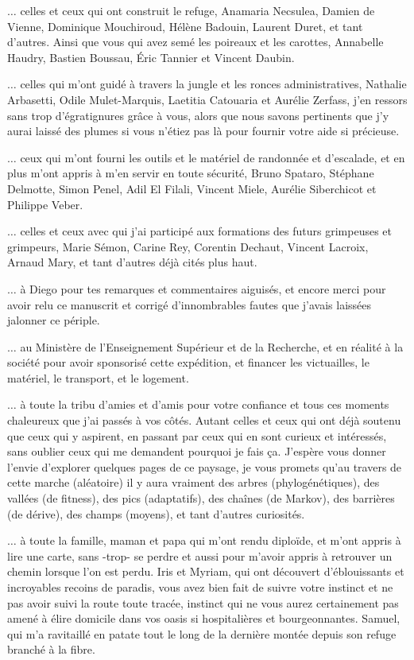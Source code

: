 $\hdots$ celles et ceux qui ont construit le refuge, Anamaria Necsulea, Damien de Vienne, Dominique Mouchiroud, Hélène Badouin, Laurent Duret, et tant d’autres.
Ainsi que vous qui avez semé les poireaux et les carottes, Annabelle Haudry, Bastien Boussau, Éric Tannier et Vincent Daubin.

$\hdots$ celles qui m’ont guidé à travers la jungle et les ronces administratives, Nathalie Arbasetti, Odile Mulet-Marquis, Laetitia Catouaria et Aurélie Zerfass, j’en ressors sans trop d’égratignures grâce à vous, alors que nous savons pertinents que j’y aurai laissé des plumes si vous n’étiez pas là pour fournir votre aide si précieuse.

$\hdots$ ceux qui m’ont fourni les outils et le matériel de randonnée et d’escalade, et en plus m’ont appris à m’en servir en toute sécurité, Bruno Spataro, Stéphane Delmotte, Simon Penel, Adil El Filali, Vincent Miele, Aurélie Siberchicot et Philippe Veber.

$\hdots$ celles et ceux avec qui j’ai participé aux formations des futurs grimpeuses et grimpeurs, Marie Sémon, Carine Rey, Corentin Dechaut, Vincent Lacroix, Arnaud Mary, et tant d’autres déjà cités plus haut.

$\hdots$ à Diego pour tes remarques et commentaires aiguisés, et encore merci pour avoir relu ce manuscrit et corrigé d’innombrables fautes que j'avais laissées jalonner ce périple.

$\hdots$ au Ministère de l’Enseignement Supérieur et de la Recherche, et en réalité à la société pour avoir sponsorisé cette expédition, et financer les victuailles, le matériel, le transport, et le logement.

$\hdots$ à toute la tribu d’amies et d’amis pour votre confiance et tous ces moments chaleureux que j’ai passés à vos côtés.
Autant celles et ceux qui ont déjà soutenu que ceux qui y aspirent, en passant par ceux qui en sont curieux et intéressés, sans oublier ceux qui me demandent pourquoi je fais ça.
J’espère vous donner l’envie d’explorer quelques pages de ce paysage, je vous promets qu’au travers de cette marche (aléatoire) il y aura vraiment des arbres (phylogénétiques), des vallées (de fitness), des pics (adaptatifs), des chaînes (de Markov), des barrières (de dérive), des champs (moyens), et tant d’autres curiosités.

$\hdots$ à toute la famille, maman et papa qui m’ont rendu diploïde, et m’ont appris à lire une carte, sans -trop- se perdre et aussi pour m’avoir appris à retrouver un chemin lorsque l'on est perdu.
Iris et Myriam, qui ont découvert d’éblouissants et incroyables recoins de paradis, vous avez bien fait de suivre votre instinct et ne pas avoir suivi la route toute tracée, instinct qui ne vous aurez certainement pas amené à élire domicile dans vos oasis si hospitalières et bourgeonnantes.
Samuel, qui m’a ravitaillé en patate tout le long de la dernière montée depuis son refuge branché à la fibre.

